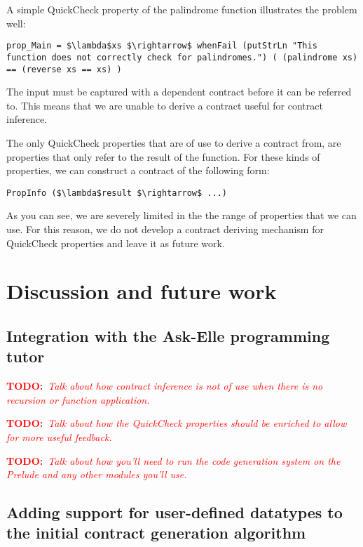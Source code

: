 \documentclass[10pt]{report}
\newcommand{\annotate}[3]{
	\begin{scriptsize}
	\textcolor{#1}{\textbf{#2}~\textit{#3}}
	\end{scriptsize}\newline}
\newcommand{\todo}[1]{\annotate{red} {TODO:} {#1}}
\newcommand{\code}[1]{%
  {%
   \setlength{\fboxsep}{-2\fboxrule}%
   \fcolorbox{black}{light-gray}{\hspace{1.5pt}\strut\texttt{#1}\hspace{1.5pt}}%
  }%
}
\begin{document}
A simple QuickCheck property of the palindrome function illustrates the problem well:

\begin{lstlisting}[mathescape]
prop_Main = $\lambda$xs $\rightarrow$ whenFail (putStrLn "This function does not correctly check for palindromes.") ( (palindrome xs) == (reverse xs == xs) )  
\end{lstlisting}

The input \code{xs} must be captured with a dependent contract before it can be referred to.
This means that we are unable to derive a contract useful for contract inference.

The only QuickCheck properties that are of use to derive a contract from, are properties that only refer to the result of the function.
For these kinds of properties, we can construct a contract of the following form:

\begin{lstlisting}[mathescape]
PropInfo ($\lambda$result $\rightarrow$ ...)
\end{lstlisting}

As you can see, we are severely limited in the the range of properties that we can use.
For this reason, we do not develop a contract deriving mechanism for QuickCheck properties and leave it as future work.

\chapter{Discussion and future work}
\label{futurework}

\section{Integration with the Ask-Elle programming tutor}

\todo{Talk about how contract inference is not of use when there is no recursion or function application.}

\todo{Talk about how the QuickCheck properties should be enriched to allow for more useful feedback.}

\todo{Talk about how you'll need to run the code generation system on the Prelude and any other modules you'll use.}

\section{Adding support for user-defined datatypes to the initial contract generation algorithm}
\label{datatype-support-initial-contracts-algorithm}
\end{document}
